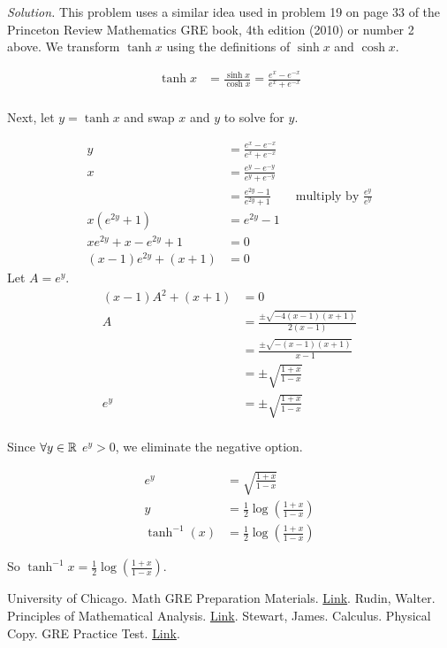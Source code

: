 \textit{Solution.} This problem uses a similar idea used in problem 19 on page 33 of the Princeton Review Mathematics GRE book, 4th edition (2010) or number 2 above. We transform $\tanh x$ using the definitions of $\sinh x$ and $\cosh x$.

\begin{align*}
\tanh x & = \frac{\sinh x}{\cosh x} = \frac{e^x - e^{-x}}{e^x + e^{-x}} \\
\end{align*}

Next, let $y = \tanh x$ and swap $x$ and $y$ to solve for $y$.

\begin{align*}
y & = \frac{e^x - e^{-x}}{e^x + e^{-x}} \\
x & = \frac{e^y - e^{-y}}{e^y + e^{-y}} \\
  & = \frac{e^{2y} - 1}{e^{2y} + 1} \qquad \textrm{multiply by } \frac{e^y}{e^y} \\
x(e^{2y} + 1) & = e^{2y} - 1 \\
xe^{2y} + x - e^{2y} + 1 & = 0 \\
(x - 1)e^{2y} + (x + 1) & = 0
\end{align*}
Let $A = e^y$.
\begin{align*}
(x - 1)A^2 + (x + 1) & = 0 \\
A & = \frac{\pm \sqrt{-4(x - 1)(x + 1)}}{2(x - 1)} \\
  & = \frac{\pm \sqrt{-(x - 1)(x + 1)}}{x - 1} \\
  & = \pm \sqrt{\frac{1 + x}{1 - x}} \\
e^y & = \pm \sqrt{\frac{1 + x}{1 - x}} \\
\end{align*}

Since $\forall y \in \mathbb{R}$ $e^y > 0$, we eliminate the negative option.

\begin{align*}
e^y & = \sqrt{\frac{1 + x}{1 - x}} \\
y & = \frac12 \log\left(\frac{1 + x}{1 - x}\right) \\
\tanh^{-1}(x) & = \frac12 \log\left(\frac{1 + x}{1 - x}\right)
\end{align*}

So $\tanh^{-1}x = \displaystyle\frac12 \log\left(\frac{1 + x}{1 - x}\right)$. \\

\begin{thebibliography}{9}
	University of Chicago. Math GRE Preparation Materials. \href{https://math.uchicago.edu/~min/GRE/}{Link}.
	Rudin, Walter. Principles of Mathematical Analysis. \href{https://notendur.hi.is/vae11/\%C3\%9Eekking/principles_of_mathematical_analysis_walter_rudin.pdf}{Link}.
	Stewart, James. Calculus. Physical Copy.
	GRE Practice Test. \href{https://www.ets.org/s/gre/pdf/practice_book_math.pdf}{Link}. 
\end{thebibliography}


